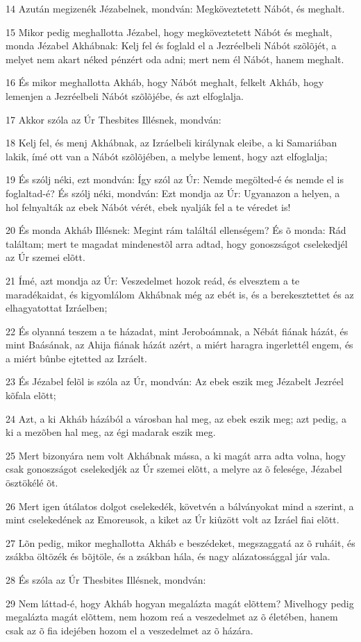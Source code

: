 \par 14 Azután megizenék Jézabelnek, mondván: Megköveztetett Nábót, és meghalt.
\par 15 Mikor pedig meghallotta Jézabel, hogy megköveztetett Nábót és meghalt, monda Jézabel Akhábnak: Kelj fel és foglald el a Jezréelbeli Nábót szõlõjét, a melyet nem akart néked pénzért oda adni; mert nem él Nábót, hanem meghalt.
\par 16 És mikor meghallotta Akháb, hogy Nábót meghalt, felkelt Akháb, hogy lemenjen a Jezréelbeli Nábót szõlõjébe, és azt elfoglalja.
\par 17 Akkor szóla az Úr Thesbites Illésnek, mondván:
\par 18 Kelj fel, és menj Akhábnak, az Izráelbeli királynak eleibe, a ki Samariában lakik, ímé ott van a Nábót szõlõjében, a melybe lement, hogy azt elfoglalja;
\par 19 És szólj néki, ezt mondván: Így szól az Úr: Nemde megölted-é és nemde el is foglaltad-é? És szólj néki, mondván: Ezt mondja az Úr: Ugyanazon a helyen, a hol felnyalták az ebek Nábót vérét, ebek nyalják fel a te véredet is!
\par 20 És monda Akháb Illésnek: Megint rám találtál ellenségem? És õ monda: Rád találtam; mert te magadat mindenestõl arra adtad, hogy gonoszságot cselekedjél az Úr szemei elõtt.
\par 21 Ímé, azt mondja az Úr: Veszedelmet hozok reád, és elvesztem a te maradékaidat, és kigyomlálom Akhábnak még az ebét is, és a berekesztettet és az elhagyatottat Izráelben;
\par 22 És olyanná teszem a te házadat, mint Jeroboámnak, a Nébát fiának házát, és mint Baásának,  az Ahija fiának házát azért, a miért haragra ingerlettél engem, és a miért bûnbe ejtetted az Izráelt.
\par 23 És Jézabel felõl is szóla az Úr, mondván: Az ebek eszik meg Jézabelt Jezréel kõfala elõtt;
\par 24 Azt, a ki Akháb házából a városban hal meg, az ebek eszik meg; azt pedig, a ki a mezõben hal meg, az égi madarak eszik meg.
\par 25 Mert bizonyára nem volt Akhábnak mássa, a ki magát arra adta volna, hogy csak gonoszságot cselekedjék az Úr szemei elõtt, a melyre az õ felesége, Jézabel  ösztökélé õt.
\par 26 Mert igen útálatos dolgot cselekedék, követvén a bálványokat mind a szerint, a mint cselekedének az Emoreusok, a kiket az Úr kiûzött volt az Izráel fiai elõtt.
\par 27 Lõn pedig, mikor meghallotta Akháb e beszédeket, megszaggatá az õ ruháit, és zsákba öltözék és bõjtöle, és a zsákban hála, és nagy alázatossággal jár vala.
\par 28 És szóla az Úr Thesbites Illésnek, mondván:
\par 29 Nem láttad-é, hogy Akháb hogyan megalázta magát elõttem? Mivelhogy pedig megalázta magát elõttem, nem hozom reá a veszedelmet az õ életében, hanem csak az õ fia idejében hozom el a veszedelmet az õ házára.

